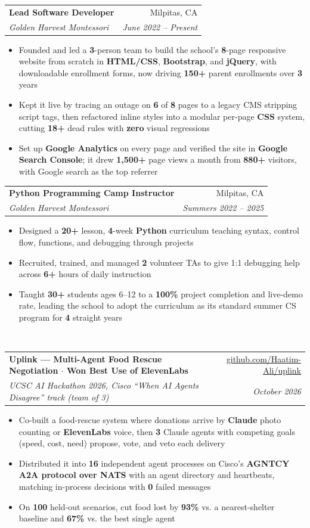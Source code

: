 \documentclass[letterpaper,10pt]{article}
\makeatletter
\newcommand{\resitem}[1]{\item #1 \vspace{-6pt}}
\newcommand{\resheading}[1]{\vspace{7pt}{\Large \textbf{#1}}\\\vspace{-8pt}\hrulefill}
\newcommand{\ressubheading}[4]{\vspace{2pt}
\begin{tabular*}{7.0in}{l@{\cftdotfill{\cftsecdotsep}\extracolsep{\fill}}r}
        \textbf{#1} & #2 \\
        \textit{#3} & \textit{#4} \\
\end{tabular*}\vspace{-6pt}}
\makeatother
\begin{document}
\ressubheading{Lead Software Developer}{Milpitas, CA}{Golden Harvest Montessori}{June 2022 -- Present}
\begin{itemize}
    \resitem{Founded and led a \textbf{3}-person team to build the school's \textbf{8}-page responsive website from scratch in \textbf{HTML/CSS}, \textbf{Bootstrap}, and \textbf{jQuery}, with downloadable enrollment forms, now driving \textbf{150+} parent enrollments over \textbf{3} years}
    \resitem{Kept it live by tracing an outage on \textbf{6} of \textbf{8} pages to a legacy CMS stripping script tags, then refactored inline styles into a modular per-page \textbf{CSS} system, cutting \textbf{18+} dead rules with \textbf{zero} visual regressions}
    \resitem{Set up \textbf{Google Analytics} on every page and verified the site in \textbf{Google Search Console}; it drew \textbf{1,500+} page views a month from \textbf{880+} visitors, with Google search as the top referrer}
\end{itemize}

\ressubheading{Python Programming Camp Instructor}{Milpitas, CA}{Golden Harvest Montessori}{Summers 2022 -- 2025}
\begin{itemize}
    \resitem{Designed a \textbf{20+} lesson, \textbf{4}-week \textbf{Python} curriculum teaching syntax, control flow, functions, and debugging through projects}
    \resitem{Recruited, trained, and managed \textbf{2} volunteer TAs to give 1:1 debugging help across \textbf{6+} hours of daily instruction}
    \resitem{Taught \textbf{30+} students ages 6--12 to a \textbf{100\%} project completion and live-demo rate, leading the school to adopt the curriculum as its standard summer CS program for \textbf{4} straight years}
\end{itemize}

\resheading{Projects}

\ressubheading{Uplink --- Multi-Agent Food Rescue Negotiation $\cdot$ Won Best Use of ElevenLabs}{\href{https://github.com/Haatim-Ali/uplink}{github.com/Haatim-Ali/uplink}}{UCSC AI Hackathon 2026, Cisco ``When AI Agents Disagree'' track (team of 3)}{October 2026}
\begin{itemize}
    \resitem{Co-built a food-rescue system where donations arrive by \textbf{Claude} photo counting or \textbf{ElevenLabs} voice, then \textbf{3} Claude agents with competing goals (speed, cost, need) propose, vote, and veto each delivery}
    \resitem{Distributed it into \textbf{16} independent agent processes on Cisco's \textbf{AGNTCY A2A protocol over NATS} with an agent directory and heartbeats, matching in-process decisions with \textbf{0} failed messages}
    \resitem{On \textbf{100} held-out scenarios, cut food lost by \textbf{93\%} vs. a nearest-shelter baseline and \textbf{67\%} vs. the best single agent}
\end{itemize}
\end{document}
